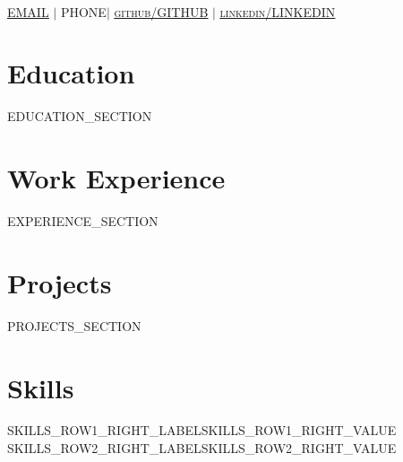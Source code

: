 \documentclass[]{resume-openfont}
\begin{document}
\newcommand{\yourName}{{{NAME}}}
\newcommand{\yourEmail}{{{EMAIL}}}
\newcommand{\yourPhone}{{{PHONE}}}
\newcommand{\githubUserName}{{{GITHUB}}}
\newcommand{\linkedInUserName}{{{LINKEDIN}}}

\begin{center}
    \Huge \scshape \latoRegular{\yourName} \\ \vspace{1pt}
    \small \href{mailto:\yourEmail}{\underline{\yourEmail}}  $|$  \yourPhone $|$
    \href{https://github.com/\githubUserName}{\underline{github/\githubUserName}} $|$
    \href{https://www.linkedin.com/in/\linkedInUserName}{\underline{linkedin/\linkedInUserName}}
\end{center}

\section{Education}
{{EDUCATION_SECTION}}

\section{Work Experience}
{{EXPERIENCE_SECTION}}

\section{Projects}
\sectionsep

{{PROJECTS_SECTION}}

\section{Skills}

\begin{skillList}
    {{{SKILLS_ROW1_RIGHT_LABEL}}}{{{SKILLS_ROW1_RIGHT_VALUE}}}
    \\
    {{{SKILLS_ROW2_RIGHT_LABEL}}}{{{SKILLS_ROW2_RIGHT_VALUE}}}
\end{skillList}
\end{document}

